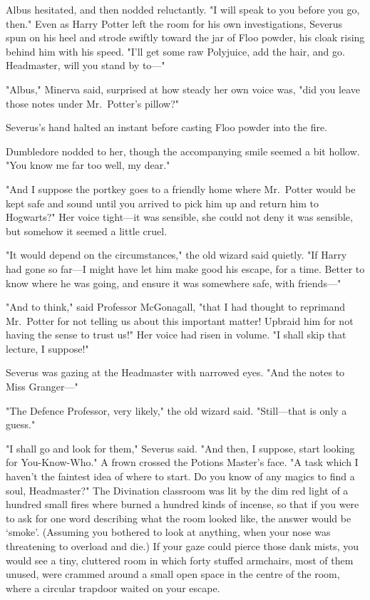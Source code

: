 Albus hesitated, and then nodded reluctantly. "I will speak to you before you
go, then."
\later
Even as Harry Potter left the room for his own investigations, Severus spun on
his heel and strode swiftly toward the jar of Floo powder, his cloak rising
behind him with his speed. "I'll get some raw Polyjuice, add the hair, and go.
Headmaster, will you stand by to---"

"Albus," Minerva said, surprised at how steady her own voice was, "did you
leave those notes under Mr.~Potter's pillow?"

Severus's hand halted an instant before casting Floo powder into the fire.

Dumbledore nodded to her, though the accompanying smile seemed a bit hollow.
"You know me far too well, my dear."

"And I suppose the portkey goes to a friendly home where Mr.~Potter would be
kept safe and sound until you arrived to pick him up and return him to
Hogwarts?" Her voice tight---it was sensible, she could not deny it was
sensible, but somehow it seemed a little cruel.

"It would depend on the circumstances," the old wizard said quietly. "If Harry
had gone so far---I might have let him make good his escape, for a time. Better
to know where he was going, and ensure it was somewhere safe, with friends---"

"And to think," said Professor McGonagall, "that I had thought to reprimand
Mr.~Potter for not telling us about this important matter! Upbraid him for not
having the sense to trust us!" Her voice had risen in volume. "I shall skip
that lecture, I suppose!"

Severus was gazing at the Headmaster with narrowed eyes. "And the notes to Miss
Granger---"

"The Defence Professor, very likely," the old wizard said. "Still---that is
only a guess."

"I shall go and look for them," Severus said. "And then, I suppose, start looking
for You-Know-Who." A frown crossed the Potions Master's face. "A task which
I haven't the faintest idea of where to start. Do you know of any magics to
find a soul, Headmaster?"
\later
The Divination classroom was lit by the dim red light of a hundred small fires
where burned a hundred kinds of incense, so that if you were to ask for one word
describing what the room looked like, the answer would be `smoke'. (Assuming you bothered
to look at anything, when your nose was threatening to overload and die.) If
your gaze could pierce those dank mists, you would see a tiny, cluttered room
in which forty stuffed armchairs, most of them unused, were crammed around a
small open space in the centre of the room, where a circular trapdoor waited on
your escape.

